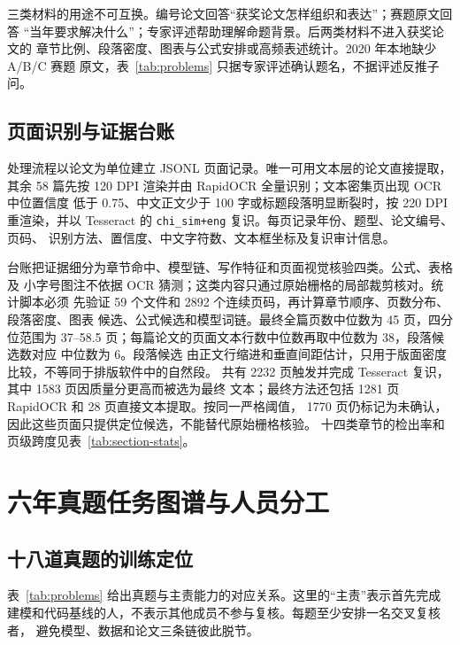 \documentclass[UTF8,a4paper,12pt]{ctexart}
\begin{document}
三类材料的用途不可互换。编号论文回答“获奖论文怎样组织和表达”；赛题原文回答
“当年要求解决什么”；专家评述帮助理解命题背景。后两类材料不进入获奖论文的
章节比例、段落密度、图表与公式安排或高频表述统计。2020 年本地缺少 A/B/C 赛题
原文，表~\ref{tab:problems} 只据专家评述确认题名，不据评述反推子问。

\subsection{页面识别与证据台账}

处理流程以论文为单位建立 JSONL 页面记录。唯一可用文本层的论文直接提取，其余
58 篇先按 120 DPI 渲染并由 RapidOCR 全量识别；文本密集页出现 OCR 中位置信度
低于 0.75、中文正文少于 100 字或标题段落明显断裂时，按 220 DPI 重渲染，并以
Tesseract 的 \texttt{chi\_sim+eng} 复识。每页记录年份、题型、论文编号、页码、
识别方法、置信度、中文字符数、文本框坐标及复识审计信息。

台账把证据细分为章节命中、模型链、写作特征和页面视觉核验四类。公式、表格及
小字号图注不依据 OCR 猜测；这类内容只通过原始栅格的局部裁剪核对。统计脚本必须
先验证 59 个文件和 2892 个连续页码，再计算章节顺序、页数分布、段落密度、图表
候选、公式候选和模型词链。最终全篇页数中位数为 45 页，四分位范围为
37--58.5 页；每篇论文的页面文本行数中位数再取中位数为 38，段落候选数对应
中位数为 6。段落候选
由正文行缩进和垂直间距估计，只用于版面密度比较，不等同于排版软件中的自然段。
共有 2232 页触发并完成 Tesseract 复识，其中 1583 页因质量分更高而被选为最终
文本；最终方法还包括 1281 页 RapidOCR 和 28 页直接文本提取。按同一严格阈值，
1770 页仍标记为未确认，因此这些页面只提供定位候选，不能替代原始栅格核验。
十四类章节的检出率和页级跨度见表~\ref{tab:section-stats}。

\section{六年真题任务图谱与人员分工}

\subsection{十八道真题的训练定位}

表~\ref{tab:problems} 给出真题与主责能力的对应关系。这里的“主责”表示首先完成
建模和代码基线的人，不表示其他成员不参与复核。每题至少安排一名交叉复核者，
避免模型、数据和论文三条链彼此脱节。
\end{document}
